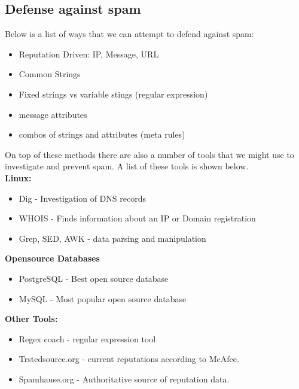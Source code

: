 \documentclass[letterpaper, onecolumn,10pt]{IEEEtran}
\begin{document}
		    \subsection{Defense against spam}
		    Below is a list of ways that we can attempt to defend against spam:
		    \begin{itemize}
		        \item Reputation Driven: IP, Message, URL
		        \item Common Strings
		        \item Fixed strings vs variable stings (regular expression)
		        \item message attributes
		        \item combos of strings and attributes (meta rules)
		    \end{itemize}
		    On top of these methods there are also a number of tools that we might use to investigate and prevent spam. A list of these tools is shown below.\\
		    
		    \textbf{Linux:}
		    \begin{itemize}
		        \item Dig - Investigation of DNS records
		        \item WHOIS - Finds information about an IP or Domain registration
		        \item Grep, SED, AWK - data parsing and manipulation
		    \end{itemize}
		    
		    \textbf{Opensource Databases}
		    \begin{itemize}
		        \item PostgreSQL - Best open source database
		        \item MySQL - Most popular open source database
		    \end{itemize}
		    
		    \textbf{Other Tools:}
		    \begin{itemize}
		        \item Regex coach - regular expression tool
		        \item Trstedsource.org - current reputations according to McAfee.
		        \item Spamhause.org - Authoritative source of reputation data.
		    \end{itemize}
		    
		    
		
\end{document}
